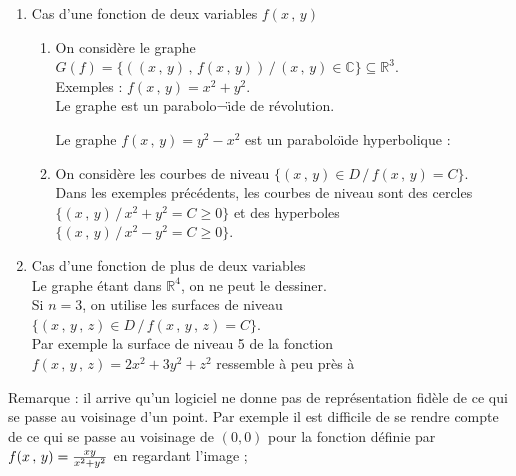 \documentclass[class=report,crop=false]{standalone}
\begin{document}
\begin{enumerate}
\item[$\bullet$] Cas d'une fonction de deux variables $f(x\,,\,y)$
\begin{enumerate}
\item[a)] On consid\`ere le graphe $G(f) = \lbrace ((x\,,\,y)\,,\,f(x\,,\,y))\,/\, (x\,,\,y) \in \mathbb{C} \rbrace \subseteq \mathbb{R}^3$.\\
Exemples : $f(x\,,\,y) = x^2 + y^2$.\\
Le graphe est un parabolo¬\"{\i}de de révolution.
\begin{center}
\end{center}
Le graphe {$f(x\,,\,y) = {y^2 - x^2}$}  est un parabolo\"\i de hyperbolique :
\begin{center}
\end{center}
\item[b)] On consid\`ere les courbes de niveau $\lbrace (x\,,\,y) \in D\,/\, f(x\,,\,y) = C \rbrace$.\\
Dans les exemples précédents, les courbes de niveau sont des cercles $\lbrace (x\,,\,y)\,/\, x^2 + y^2 = C \geqslant 0 \rbrace$ et des hyperboles $\lbrace (x\,,\,y)\,/\, x^2 - y^2 = C \geqslant 0 \rbrace$.

\end{enumerate}
\item[$\bullet$] Cas d'une fonction de plus de deux variables \\
Le graphe étant dans $\mathbb{R}^4$, on ne peut le dessiner.\\
Si $n = 3$, on utilise les surfaces de niveau $\lbrace (x\,,\,y\,,\,z) \in D \,/\, f(x\,,\,y\,,\,z) = C \rbrace$.\\
Par exemple  la surface de niveau 5 de la fonction $f(x\,,\,y\,,\,z) = 2 x^2 + 3y^2 + z^2$ ressemble \`a peu pr\`es \`a  
\begin{center}
\end{center}
\end{enumerate}

Remarque : il arrive qu'un logiciel ne donne pas de représentation fid\`ele de ce qui se passe au voisinage d'un point. Par exemple il est difficile de se rendre compte de ce qui se passe au voisinage de $(0,0)$ pour la fonction définie par  $f(x\,,\,y) ={{xy}\over{x^2+y^2}}$ en regardant l'image ;
\begin{center}
\end{center}
\end{document}
